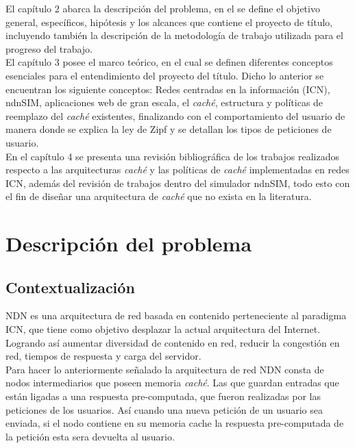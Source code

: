 \documentclass[12pt]{ociamthesis}  %
\begin{document}
El capítulo 2 abarca la descripción del problema, en el se define el objetivo general, específicos, hipótesis y los alcances que contiene el proyecto de título, incluyendo también la descripción de la metodología de trabajo utilizada para el progreso del trabajo.\\

El capítulo 3 posee el marco teórico, en el cual se definen diferentes conceptos esenciales para el entendimiento del proyecto del título. Dicho lo anterior se encuentran los siguiente conceptos: Redes centradas en la información (ICN), ndnSIM, aplicaciones web de gran escala, el \textit{caché}, estructura y políticas de reemplazo del \textit{caché} existentes, finalizando con el comportamiento del usuario de manera donde se explica la ley de Zipf y se detallan los tipos de peticiones de usuario.\\

En el capítulo 4 se presenta una revisión bibliográfica de los trabajos realizados respecto a las arquitecturas \textit{caché} y las políticas de \textit{caché} implementadas en redes ICN, además del revisión de trabajos dentro del simulador ndnSIM, todo esto con el fin de diseñar una arquitectura de \textit{caché} que no exista en la literatura.\\

\chapter{Descripción del problema}
\section{Contextualización}
NDN es una arquitectura de red basada en contenido perteneciente al paradigma ICN, que tiene como objetivo desplazar la actual arquitectura del Internet. Logrando así aumentar diversidad de contenido en red, reducir la congestión en red, tiempos de respuesta y carga del servidor.\\

Para hacer lo anteriormente señalado la arquitectura de red NDN consta de nodos intermediarios que poseen memoria \textit{caché}. Las que guardan entradas que están ligadas a una respuesta pre-computada, que fueron realizadas por las peticiones de los usuarios. Así cuando una nueva petición de un usuario sea enviada, si el nodo contiene en su memoria cache la respuesta pre-computada de la petición esta sera devuelta al usuario.\\
\end{document}

